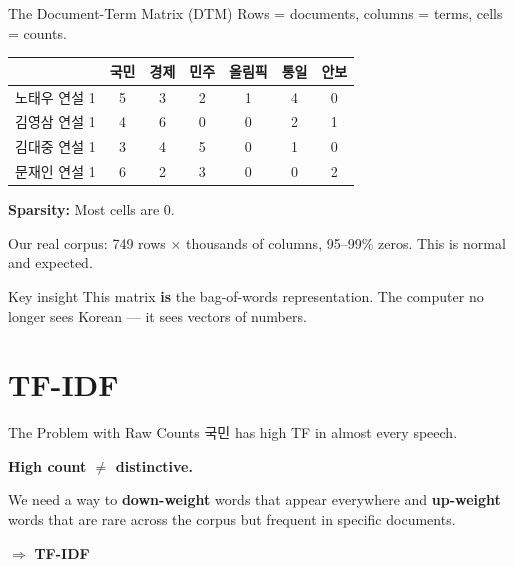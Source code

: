 \documentclass[aspectratio=169,11pt]{beamer}
\begin{document}
\begin{frame}{The Document-Term Matrix (DTM)}
    Rows = documents, columns = terms, cells = counts.

    \vspace{0.3cm}

    \begin{center}
    \begin{tabular}{@{} l c c c c c c @{}}
        \toprule
         & 국민 & 경제 & 민주 & 올림픽 & 통일 & 안보 \\
        \midrule
        노태우 연설 1 & 5 & 3 & 2 & 1 & 4 & 0 \\
        김영삼 연설 1 & 4 & 6 & 0 & 0 & 2 & 1 \\
        김대중 연설 1 & 3 & 4 & 5 & 0 & 1 & 0 \\
        문재인 연설 1 & 6 & 2 & 3 & 0 & 0 & 2 \\
        \bottomrule
    \end{tabular}
    \end{center}

    \vspace{0.3cm}

    \textbf{Sparsity:} Most cells are 0.

    \vspace{0.2cm}

    Our real corpus: 749 rows $\times$ thousands of columns, 95--99\% zeros. This is normal and expected.

    \vspace{0.3cm}

    \begin{block}{Key insight}
        This matrix \textbf{is} the bag-of-words representation. The computer no longer sees Korean --- it sees vectors of numbers.
    \end{block}
\end{frame}

\section{TF-IDF}

\begin{frame}{The Problem with Raw Counts}
    국민 has high TF in almost every speech.

    \vspace{0.3cm}

    \textbf{High count $\neq$ distinctive.}

    \vspace{0.3cm}

    We need a way to \textbf{down-weight} words that appear everywhere and \textbf{up-weight} words that are rare across the corpus but frequent in specific documents.

    \vspace{0.5cm}

    \begin{center}
        {\Large $\Rightarrow$ \textbf{TF-IDF}}
    \end{center}
\end{frame}
\end{document}

